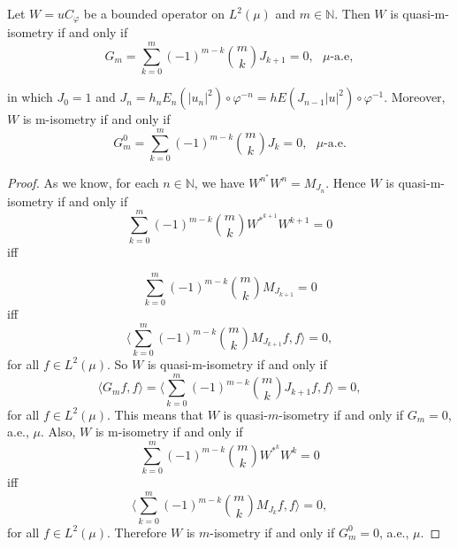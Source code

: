 \documentclass[10pt,a4paper]{amsart}
\begin{document}
\begin{thm}\label{t1.6}
Let $W=uC_{\varphi}$ be a bounded operator on $L^2(\mu)$ and $m\in \mathbb{N}$. Then $W$ is quasi-m-isometry if and only if
$$G_m=\sum_{k=0}^{m}(-1)^{m-k}\binom{m}{k}J_{k+1}=0,\ \ \ \text{$\mu$-a.e},$$

in which $J_0=1$ and $J_n=h_nE_n(|u_n|^2)\circ\varphi^{-n}=hE(J_{n-1}|u|^2)\circ\varphi^{-1}$.
Moreover, $W$ is m-isometry if and only if 
$$G^0_m=\sum_{k=0}^{m}(-1)^{m-k}\binom{m}{k}J_{k}=0, \ \ \ \text{$\mu$-a.e}.$$
\end{thm}

\begin{proof}
As we know, for each $n\in \mathbb{N}$, we have $W^{n^*}W^n=M_{J_n}$. Hence $W$ is quasi-m-isometry if and only if
$$\sum_{k=0}^{m}(-1)^{m-k}\binom{m}{k}W^{*^{k+1}}W^{k+1}=0$$
iff

$$\sum_{k=0}^{m}(-1)^{m-k}\binom{m}{k}M_{J_{k+1}}=0$$
iff
$$\langle \sum_{k=0}^{m}(-1)^{m-k}\binom{m}{k}M_{J_{k+1}}f,f\rangle=0,$$
 for all $f\in L^2(\mu)$.
So $W$ is quasi-m-isometry if and only if
$$\langle G_mf,f\rangle=\langle \sum_{k=0}^{m}(-1)^{m-k}\binom{m}{k}J_{k+1}f,f\rangle=0,$$
 for all $f\in L^2(\mu)$. This means that $W$ is quasi-$m$-isometry if and only if $G_m=0$, a.e., $\mu$. Also,  $W$ is m-isometry if and only if
$$\sum_{k=0}^{m}(-1)^{m-k}\binom{m}{k}W^{*^{k}}W^{k}=0$$
iff
$$\langle \sum_{k=0}^{m}(-1)^{m-k}\binom{m}{k}M_{J_{k}}f,f\rangle=0,$$
 for all $f\in L^2(\mu)$. Therefore $W$ is $m$-isometry if and only if $G^0_m=0$, a.e., $\mu$.
\end{proof}
\end{document}
